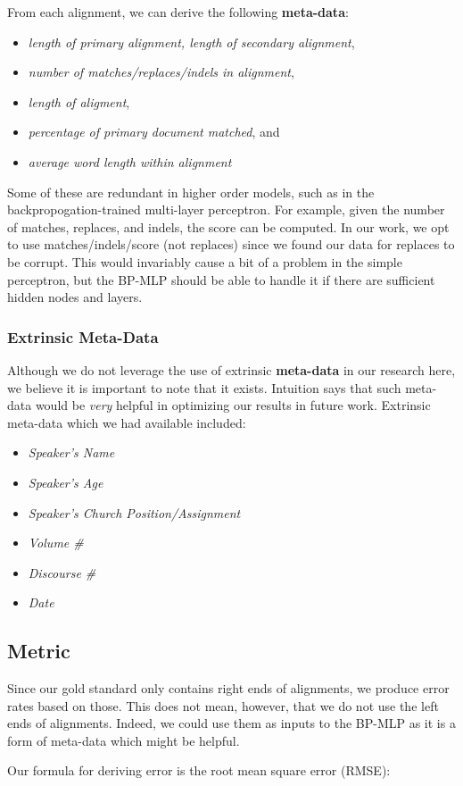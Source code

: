 From each alignment, we can derive the following \textbf{meta-data}:
	\begin{itemize}
		\item \textit{length of primary alignment, length of secondary alignment},
		\item \textit{number of matches/replaces/indels in alignment},
		\item \textit{length of aligment},
		\item \textit{percentage of primary document matched}, and
		\item \textit{average word length within alignment}
	\end{itemize}

Some of these are redundant in higher order models, such as in the backpropogation-trained multi-layer perceptron. For example, given the number of matches, replaces, and indels, the score can be computed. In our work, we opt to use matches/indels/score (not replaces) since we found our data for replaces to be corrupt. This would invariably cause a bit of a problem in the simple perceptron, but the BP-MLP should be able to handle it if there are sufficient hidden nodes and layers.

\subsubsection{Extrinsic Meta-Data}
Although we do not leverage the use of extrinsic \textbf{meta-data} in our research here, we believe it is important to note that it exists. Intuition says that such meta-data would be \textit{very} helpful in optimizing our results in future work. Extrinsic meta-data which we had available included:
	\begin{itemize}
		\item \textit{Speaker's Name}
		\item \textit{Speaker's Age}
		\item \textit{Speaker's Church Position/Assignment}
		\item \textit{Volume \#}
		\item \textit{Discourse \#}
		\item \textit{Date}
	\end{itemize}


\subsection{Metric}
Since our gold standard only contains right ends of alignments, we produce error rates based on those. This does not mean, however, that we do not use the left ends of alignments. Indeed, we could use them as inputs to the BP-MLP as it is a form of meta-data which might be helpful.

Our formula for deriving error is the root mean square error (RMSE):


